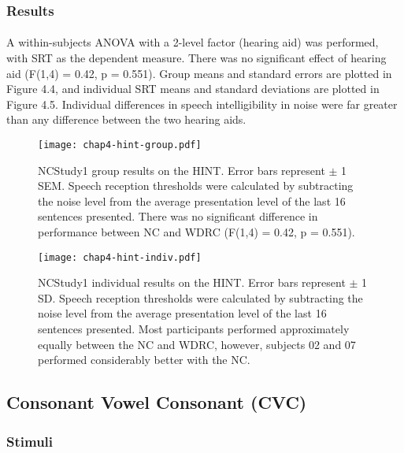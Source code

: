 \subsubsection{Results}
\paragraph{}A within-subjects ANOVA with a 2-level factor (hearing aid) was performed, with SRT as the dependent measure.  There was no significant effect of hearing aid (F(1,4) = 0.42, p = 0.551).  Group means and standard errors are plotted in Figure 4.4, and individual SRT means and standard deviations are plotted in Figure 4.5.  Individual differences in speech intelligibility in noise were far greater than any difference between the two hearing aids.

\begin{figure}[htp]
\begin{center}
\texttt{[image: chap4-hint-group.pdf]} \\
\caption[NCStudy1 group results on the HINT]{NCStudy1 group results on the HINT.  Error bars represent $\pm$ 1 SEM.  Speech reception thresholds were calculated by subtracting the noise level from the average presentation level of the last 16 sentences presented.  There was no significant difference in performance between NC and WDRC (F(1,4) = 0.42, p = 0.551).}
\label{ch4-hint-group}
\end{center}
\end{figure}

\begin{figure}[htp]
\begin{center}
\texttt{[image: chap4-hint-indiv.pdf]} \\
\caption[NCStudy1 individual results on the HINT]{NCStudy1 individual results on the HINT.  Error bars represent $\pm$ 1 SD.  Speech reception thresholds were calculated by subtracting the noise level from the average presentation level of the last 16 sentences presented.  Most participants performed approximately equally between the NC and WDRC, however, subjects 02 and 07 performed considerably better with the NC.}
\label{ch4-hint-indiv}
\end{center}
\end{figure}

\subsection{Consonant Vowel Consonant (CVC)}
\subsubsection{Stimuli}
